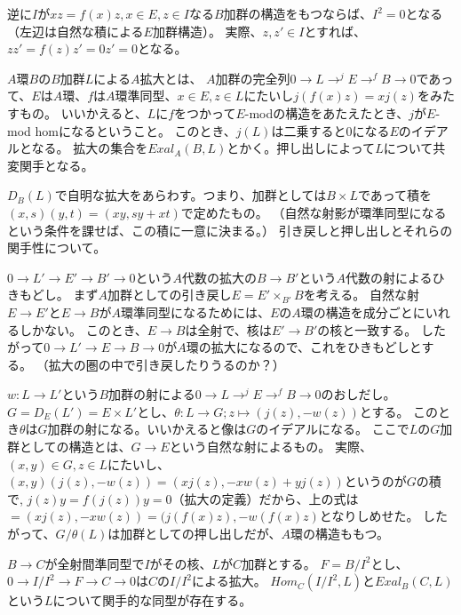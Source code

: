 \documentclass{jsarticle}
\begin{document}
逆に$I$が$xz=f(x)z, x\in E, z\in I$なる$B$加群の構造をもつならば、$I^2=0$となる（左辺は自然な積による$E$加群構造）。
実際、$z, z'\in I$とすれば、$zz'=f(z)z'=0z'=0$となる。

\begin{dfn}
$A$環$B$の$B$加群$L$による$A$拡大とは、
$A$加群の完全列$0 \to L \to^j E \to^f B \to 0$であって、$E$は$A$環、$f$は$A$環準同型、$x\in E, z\in L$にたいし$j(f(x)z)=xj(z)$をみたすもの。
いいかえると、$L$に$f$をつかって$E$-modの構造をあたえたとき、$j$が$E$-mod homになるということ。
このとき、$j(L)$は二乗すると$0$になる$E$のイデアルとなる。
拡大の集合を$Exal_A(B, L)$とかく。押し出しによって$L$について共変関手となる。
\end{dfn}

$D_B(L)$で自明な拡大をあらわす。つまり、加群としては$B\times L$であって積を$(x, s)(y, t)=(xy, sy+xt)$で定めたもの。
（自然な射影が環準同型になるという条件を課せば、この積に一意に決まる。）
引き戻しと押し出しとそれらの関手性について。

$0\to L'\to E'\to B'\to 0$という$A$代数の拡大の$B\to B'$という$A$代数の射によるひきもどし。
まず$A$加群としての引き戻し$E=E'\times_{B'} B$を考える。
自然な射$E\to E'$と$E\to B$が$A$環準同型になるためには、$E$の$A$環の構造を成分ごとにいれるしかない。
このとき、$E\to B$は全射で、核は$E'\to B'$の核と一致する。
したがって$0\to L'\to E\to B\to 0$が$A$環の拡大になるので、これをひきもどしとする。
（拡大の圏の中で引き戻したりうるのか？）

$w:L\to L'$という$B$加群の射による$0\to L\to^j E\to^f B\to 0$のおしだし。
$G=D_E(L')=E\times L'$とし、$\theta:L\to G;z\mapsto(j(z), -w(z))$とする。
このとき$\theta$は$G$加群の射になる。いいかえると像は$G$のイデアルになる。
ここで$L$の$G$加群としての構造とは、$G\to E$という自然な射によるもの。
実際、$(x, y)\in G, z\in L$にたいし、$(x, y)(j(z), -w(z))=(xj(z), -xw(z)+yj(z))$というのが$G$の積で,
$j(z)y=f(j(z))y=0$（拡大の定義）だから、上の式は$=(xj(z), -xw(z))=(j(f(x)z), -w(f(x)z)$となりしめせた。
したがって、$G/\theta(L)$は加群としての押し出しだが、$A$環の構造ももつ。



\begin{prop}
$B\to C$が全射間準同型で$I$がその核、$L$が$C$加群とする。
$F=B/I^2$とし、$0\to I/I^2\to F \to C\to 0$は$C$の$I/I^2$による拡大。
$Hom_C(I/I^2, L)$と$Exal_B(C, L)$という$L$について関手的な同型が存在する。
\end{prop}
\end{document}
